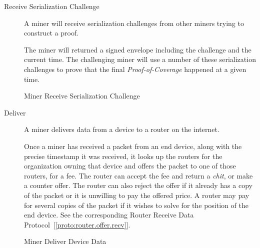 \documentclass[10pt, nonatbib, nocopyrightspace, reprint]{sigplanconf}
\begin{document}
\begin{description}
  \item [Receive Serialization Challenge] A miner will receive serialization challenges from other miners trying to construct a proof.

    The miner will returned a signed envelope including the challenge and the current time. The challenging miner will use a number of these serialization challenges to prove that the final \emph{Proof-of-Coverage} happened at a given time.

    \begin{algorithm}[!htb]
      \DontPrintSemicolon
      \caption{Miner Receive Serialization Challenge}\label{proto:miner.recv.challenge.serialization}

    \end{algorithm}
    \FloatBarrier

  \item [Deliver] A miner delivers data from a device to a router on the internet.

    Once a miner has received a packet from an end device, along with the precise timestamp it was received, it looks up the routers for the organization owning that device and offers the packet to one of those routers, for a fee. The router can accept the fee and return a \emph{chit}, or make a counter offer. The router can also reject the offer if it already has a copy of the packet or it is unwilling to pay the offered price. A router may pay for several copies of the packet if it wishes to solve for the position of the end device. See the corresponding Router Receive Data Protocol~[\ref{proto:router.offer.recv}].

    \begin{algorithm}[!htb]
      \DontPrintSemicolon
      \caption{Miner Deliver Device Data}\label{proto:miner.data.deliver}


\end{algorithm}
\end{description}
\end{document}
